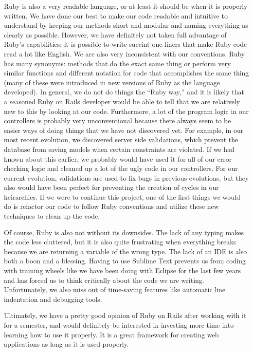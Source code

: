 \documentclass{article}
\begin{document}
Ruby is also a very readable language, or at least it should be when it is properly written.  We have done our best to make our code readable and intuitive to understand by keeping our methods short and modular and naming everything as clearly as possible.  However, we have definitely not taken full advantage of Ruby's capabilities; it is possible to write succint one-liners that make Ruby code read a lot like English.  We are also very inconsistent with our conventions.  Ruby has many synonyms: methods that do the exact same thing or perform very similar functions and different notation for code that accomplishes the same thing (many of these were introduced in new versions of Ruby as the language developed).  In general, we do not do things the ``Ruby way,'' and it is likely that a seasoned Ruby on Rails developer would be able to tell that we are relatively new to this by looking at our code.  Furthermore, a lot of the program logic in our controllers is probably very unconventional because there always seem to be easier ways of doing things that we have not discovered yet.  For example, in our most recent evolution, we discovered server side validations, which prevent the database from saving models when certain constraints are violated.  If we had known about this earlier, we probably would have used it for all of our error checking logic and cleaned up a lot of the ugly code in our controllers.  For our current evolution, validations are used to fix bugs in previous evolutions, but they also would have been perfect for preventing the creation of cycles in our heirarchies.  If we were to continue this project, one of the first things we would do is refactor our code to follow Ruby conventions and utilize these new techniques to clean up the code.\par
Of course, Ruby is also not without its downsides.  The lack of any typing makes the code less cluttered, but it is also quite frustrating when everything breaks because we are returning a variable of the wrong type.  The lack of an IDE is also both a boon and a blessing.  Having to use Sublime Text prevents us from coding with training wheels like we have been doing with Eclipse for the last few years and has forced us to think critically about the code we are writing.  Unfortunately, we also miss out of time-saving features like automatic line indentation and debugging tools.\par
Ultimately, we have a pretty good opinion of Ruby on Rails after working with it for a semester, and would definitely be interested in investing more time into learning how to use it properly.  It is a great framework for creating web applications as long as it is used properly.
\end{document}
